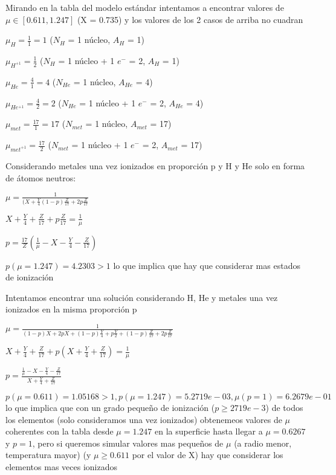 \documentclass[10pt]{book}
\begin{document}
\begin{description}
Mirando en la tabla del modelo estándar intentamos a encontrar valores de $\mu \in [0.611, 1.247]$ (X = 0.735) y los valores de los 2 casos de arriba no cuadran


$ \mu_H  = \frac{1}{1} = 1$ ($N_H$ = 1 núcleo, $A_H$ = 1)

$ \mu_{H^{+1}}  = \frac{1}{2} $ ($N_H$ = 1 núcleo + 1 $e^-$ = 2, $A_H$ = 1)

$ \mu_{He}  = \frac{4}{1} = 4$ ($N_{He}$ = 1 núcleo, $A_{He}$ = 4)

$ \mu_{He^{+1}}  = \frac{4}{2} = 2$ ($N_{He}$ = 1 núcleo + 1 $e^-$ = 2, $A_{He}$ = 4)

$ \mu_{met}  = \frac{17}{1} = 17$ ($N_{met}$ = 1 núcleo, $A_{met}$ = 17)

$ \mu_{met^{+1}}  = \frac{17}{2}$ ($N_{met}$ = 1 núcleo + 1 $e^{-}$ = 2, $A_{met}$ = 17)

Considerando  metales una vez ionizados en proporción p y H y He solo en forma de átomos neutros:

$ \mu = \frac{1}{(X + \frac{Y}{4}  (1-p)\frac{Z}{17} + 2 p \frac{Z}{17}}$

$ X + \frac{Y}{4} +\frac{Z}{17}+  p \frac{Z}{17} = \frac{1}{\mu} $

$ p = \frac{17}{Z} (\frac{1}{\mu} - X - \frac{Y}{4} - \frac{Z}{17}) $

$p(\mu = 1.247) = 4.2303 > 1$ lo que implica que hay que considerar mas estados de ionización

Intentamos encontrar una solución considerando H, He y metales una vez ionizados en la misma proporción p

$ \mu = \frac{1}{(1-p)X + 2p X+ (1-p)\frac{Y}{4} + p \frac{Y}{2}+ (1-p)\frac{Z}{17} + 2 p \frac{Z}{17}}$

$ X + \frac{Y}{4} +\frac{Z}{17}+  p (X + \frac{Y}{4} + \frac{Z}{17}) = \frac{1}{\mu} $

$ p = \frac{\frac{1}{\mu} - X - \frac{Y}{4} - \frac{Z}{17}}{X + \frac{Y}{4} + \frac{Z}{17}} $

$p(\mu = 0.611) = 1.05168 > 1, p(\mu = 1.247) = 5.2719e-03, \mu(p = 1) = 6.2679e-01 $ lo que 
implica que con un grado pequeño de ionización ($p \ge 2719e-3$) de todos los elementos (solo consideramos una vez ionizados) 
obtenemeos valores de $\mu$ coherentes con la tabla desde  $\mu = 1.247$  en la superficie  hasta llegar  a $\mu = 0.6267$ y $p=1$, 
pero si queremos simular valores mas pequeños de $\mu$ (a radio menor, temperatura mayor)
 (y $\mu \ge 0.611$ por el valor de X) hay que considerar los elementos mas veces ionizados 



\end{description}
\end{document}

